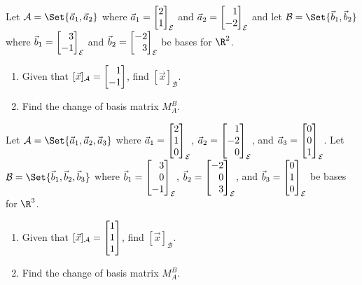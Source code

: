 \begin{exercises}
	\begin{problist}
		\prob Let $\mathcal A=\Set{\vec a_1,\vec a_2}$ where $\vec a_1=\mat{2\\1}_{\mathcal E}$ and $\vec a_2=\mat{1\\-2}_{\mathcal E}$ and let $\mathcal B=\Set{\vec b_1,\vec b_2}$ where $\vec b_1=\mat{3\\-1}_{\mathcal E}$ and $\vec b_2=\mat{-2\\3}_{\mathcal E}$ be bases for $\R^2$. 
	    \begin{enumerate}
	        \item Given that $[\vec x]_{\mathcal A}=\mat{1\\-1}$, find $[\vec x]_{\mathcal B}$.
	        \item Find the change of basis matrix $M_{A}^{B}$.
	    \end{enumerate}
	    
	    \prob Let $\mathcal A=\Set{\vec a_1,\vec a_2,\vec a_3}$ where $\vec a_1=\mat{2\\1\\0}_{\mathcal E}$, $\vec a_2=\mat{1\\-2\\0}_{\mathcal E}$, and $\vec a_3=\mat{0\\0\\1}_{\mathcal E}$. Let $\mathcal B=\Set{\vec b_1,\vec b_2,\vec b_3}$ where $\vec b_1=\mat{3\\0\\-1}_{\mathcal E}$, $\vec b_2=\mat{-2\\0\\3}_{\mathcal E}$, and $\vec b_3=\mat{0\\1\\0}_{\mathcal E}$ be bases for $\R^3$. 
	    \begin{enumerate}
	        \item Given that $[\vec x]_{\mathcal A}=\mat{1\\1\\1}$, find $[\vec x]_{\mathcal B}$.
	        \item Find the change of basis matrix $M_{A}^{B}$.
	    \end{enumerate}
	    

\end{problist}
\end{exercises}
